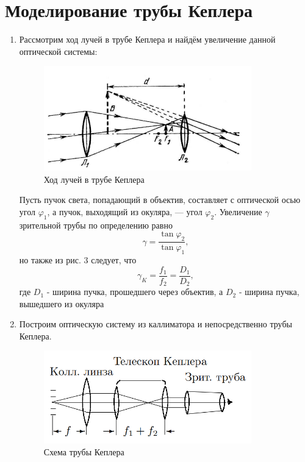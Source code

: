 \section*{Моделирование трубы Кеплера}
\begin{enumerate}
    \item Рассмотрим ход лучей в трубе Кеплера и найдём увеличение данной оптической системы:
    
    \begin{figure}[h]
    \centering
    \includegraphics[width=9cm]{kepler.PNG}
    \caption{Ход лучей в трубе Кеплера}
    \label{fig:vac}
\end{figure}

Пусть пучок света, попадающий в объектив, составляет с оптической осью угол $\varphi_1$, а пучок, выходящий из окуляра, — угол $\varphi_2$. Увеличение $\gamma$ зрительной трубы по определению равно
\begin{equation}
    \gamma = \frac{\tan \varphi_2}{\tan \varphi_1},
\end{equation}
но также из рис. 3 следует, что 
\begin{equation}
    \gamma_K = \frac{f_1}{f_2} = \frac{D_1}{D_2},
\end{equation}
где $D_1$ - ширина пучка, прошедшего через объектив, а $D_2$ - ширина пучка, вышедшего из окуляра

\item Построим оптическую систему из каллиматора и непосредственно трубы Кеплера. 

    \begin{figure}[h]
    \centering
    \includegraphics[width=9cm]{kepler_2.PNG}
    \caption{Схема трубы Кеплера}
    \label{fig:vac}
\end{figure}


\end{enumerate}
